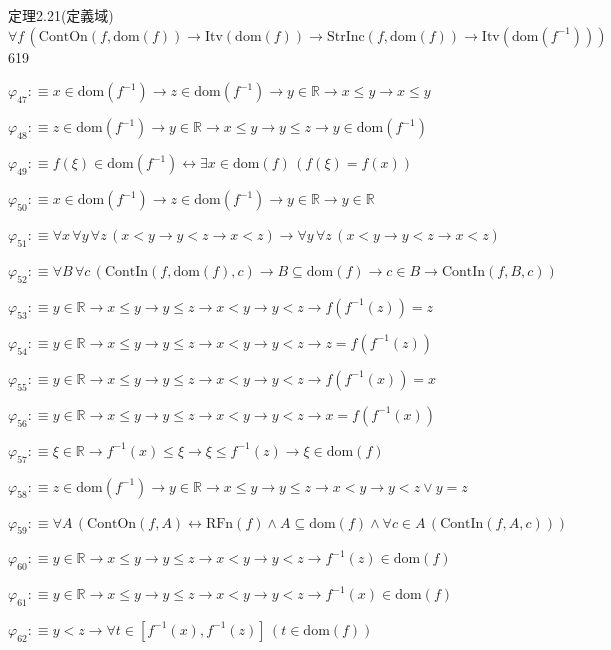 \begin{fullproof}{定理2.21(定義域)}{$\forall f\,(\mathrm{ContOn}(f,\mathrm{dom}(f)) \to \mathrm{Itv}(\mathrm{dom}(f)) \to \mathrm{StrInc}(f,\mathrm{dom}(f)) \to \mathrm{Itv}(\mathrm{dom}(f^{-1})))$}{619}
\begin{abbrevlist}
\item $\varphi_{47} :\equiv x \in \mathrm{dom}(f^{-1}) \to z \in \mathrm{dom}(f^{-1}) \to y \in \mathbb{R} \to x \leq y \to x \leq y$
\item $\varphi_{48} :\equiv z \in \mathrm{dom}(f^{-1}) \to y \in \mathbb{R} \to x \leq y \to y \leq z \to y \in \mathrm{dom}(f^{-1})$
\item $\varphi_{49} :\equiv f(\xi) \in \mathrm{dom}(f^{-1}) \leftrightarrow \exists x \in \mathrm{dom}(f)\,(f(\xi) = f(x))$
\item $\varphi_{50} :\equiv x \in \mathrm{dom}(f^{-1}) \to z \in \mathrm{dom}(f^{-1}) \to y \in \mathbb{R} \to y \in \mathbb{R}$
\item $\varphi_{51} :\equiv \forall x\,\forall y\,\forall z\,(x < y \to y < z \to x < z) \to \forall y\,\forall z\,(x < y \to y < z \to x < z)$
\item $\varphi_{52} :\equiv \forall B\,\forall c\,(\mathrm{ContIn}(f,\mathrm{dom}(f),c) \to B \subseteq \mathrm{dom}(f) \to c \in B \to \mathrm{ContIn}(f,B,c))$
\item $\varphi_{53} :\equiv y \in \mathbb{R} \to x \leq y \to y \leq z \to x < y \to y < z \to f(f^{-1}(z)) = z$
\item $\varphi_{54} :\equiv y \in \mathbb{R} \to x \leq y \to y \leq z \to x < y \to y < z \to z = f(f^{-1}(z))$
\item $\varphi_{55} :\equiv y \in \mathbb{R} \to x \leq y \to y \leq z \to x < y \to y < z \to f(f^{-1}(x)) = x$
\item $\varphi_{56} :\equiv y \in \mathbb{R} \to x \leq y \to y \leq z \to x < y \to y < z \to x = f(f^{-1}(x))$
\item $\varphi_{57} :\equiv \xi \in \mathbb{R} \to f^{-1}(x) \leq \xi \to \xi \leq f^{-1}(z) \to \xi \in \mathrm{dom}(f)$
\item $\varphi_{58} :\equiv z \in \mathrm{dom}(f^{-1}) \to y \in \mathbb{R} \to x \leq y \to y \leq z \to x < y \to y < z \lor y = z$
\item $\varphi_{59} :\equiv \forall A\,(\mathrm{ContOn}(f,A) \leftrightarrow \mathrm{RFn}(f) \land A \subseteq \mathrm{dom}(f) \land \forall c \in A\,(\mathrm{ContIn}(f,A,c)))$
\item $\varphi_{60} :\equiv y \in \mathbb{R} \to x \leq y \to y \leq z \to x < y \to y < z \to f^{-1}(z) \in \mathrm{dom}(f)$
\item $\varphi_{61} :\equiv y \in \mathbb{R} \to x \leq y \to y \leq z \to x < y \to y < z \to f^{-1}(x) \in \mathrm{dom}(f)$
\item $\varphi_{62} :\equiv y < z \to \forall t \in [f^{-1}(x),f^{-1}(z)]\,(t \in \mathrm{dom}(f))$

\end{abbrevlist}
\end{fullproof}
